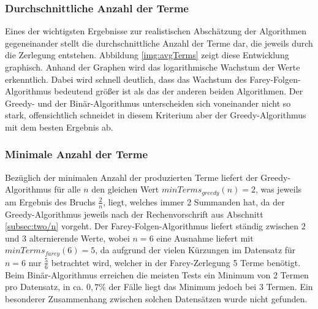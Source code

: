 \subsubsection{Durchschnittliche Anzahl der Terme}
Eines der wichtigsten Ergebnisse zur realistischen Abschätzung der Algorithmen gegeneinander stellt die durchschnittliche Anzahl der Terme dar, die jeweils durch die Zerlegung entstehen. Abbildung \ref{img:avgTerms} zeigt diese Entwicklung graphisch.
Anhand der Graphen wird das logarithmische Wachstum der Werte erkenntlich. Dabei wird schnell deutlich, dass das Wachstum des Farey-Folgen-Algorithmus bedeutend größer ist als das der anderen beiden Algorithmen. Der Greedy- und der Binär-Algorithmus unterscheiden sich voneinander nicht so stark, offensichtlich schneidet in diesem Kriterium aber der Greedy-Algorithmus mit dem besten Ergebnis ab.

\subsubsection{Minimale Anzahl der Terme}
Bezüglich der minimalen Anzahl der produzierten Terme liefert der Greedy-Algorithmus für alle $n$ den gleichen Wert $minTerms_{greedy}(n) = 2$, was jeweils am Ergebnis des Bruchs $\frac{2}{n}$, liegt, welches immer 2 Summanden hat, da der Greedy-Algorithmus jeweils nach der Rechenvorschrift aus Abschnitt \ref{subsec:two/n} vorgeht. Der Farey-Folgen-Algorithmus liefert ständig zwischen $2$ und $3$ alternierende Werte, wobei $n=6$ eine Ausnahme liefert mit $minTerms_{farey}(6) = 5$, da aufgrund der vielen Kürzungen im Datensatz für $n=6$ nur $\frac{5}{6}$ betrachtet wird, welcher in der Farey-Zerlegung 5 Terme benötigt. Beim Binär-Algorithmus erreichen die meisten Tests ein Minimum von 2 Termen pro Datensatz, in ca. $0,7\%$ der Fälle liegt das Minimum jedoch bei 3 Termen. Ein besonderer Zusammenhang zwischen solchen Datensätzen wurde nicht gefunden.

